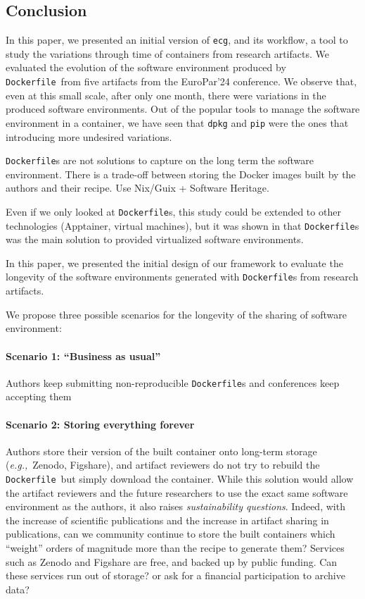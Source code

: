 \documentclass[sigconf,natbib=false]{acmart}
\newcommand{\eg}{\emph{e.g.,}}
\newcommand{\df}{\texttt{Dockerfile}}
\newcommand{\ecg}{\texttt{ecg}}
\begin{document}
\subsection{Conclusion}

In this paper, we presented an initial version of \ecg, and its workflow, a tool to study the variations through time of containers from research artifacts.
We evaluated the evolution of the software environment produced by \df\ from five artifacts from the EuroPar'24 conference.
We observe that, even at this small scale, after only one month, there were variations in the produced software environments.
Out of the popular tools to manage the software environment in a container, we have seen that \texttt{dpkg} and \texttt{pip} were the ones that introducing more undesired variations.

\texttt{Dockerfile}s are not solutions to capture on the long term the software environment.
There is a trade-off between storing the Docker images built by the authors and their recipe.
Use Nix/Guix + Software Heritage.

Even if we only looked at \df s, this study could be extended to other technologies (Apptainer, virtual machines), but it was shown in \cite{guilloteau2024longevity} that \df s was the main solution to provided virtualized software environments.

In this paper, we presented the initial design of our framework to evaluate the longevity of the software environments generated with \df s from research artifacts.



We propose three possible scenarios for the longevity of the sharing of software environment:

\paragraph{Scenario 1: ``Business as usual''}
Authors keep submitting non-reproducible \df s and conferences keep accepting them

\paragraph{Scenario 2: Storing everything forever}
Authors store their version of the built container onto long-term storage (\eg\ Zenodo, Figshare), and artifact reviewers do not try to rebuild the \df\ but simply download the container.
While this solution would allow the artifact reviewers and the future researchers to use the exact same software environment as the authors, it also raises \emph{sustainability questions}.
Indeed, with the increase of scientific publications and the increase in artifact sharing in publications, can we community continue to store the built containers which ``weight'' orders of magnitude more than the recipe to generate them?
Services such as Zenodo and Figshare are free, and backed up by public funding.
Can these services run out of storage? or ask for a financial participation to archive data?
\end{document}

